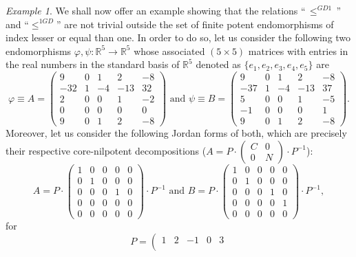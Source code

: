 \documentclass[10pt,a4paper]{amsart}
\theoremstyle{plain}
\theoremstyle{remark}
\newtheorem{exam}{Example}
\numberwithin{equation}{section} \numberwithin{defn}{section}
\newcommand{\f}{\varphi}
\newcommand{\g}{\psi}
\newcommand{\R}{\mathbb{R}}
\begin{document}
\begin{exam}\label{Ex: Non Trivial}
We shall now offer an example showing that the relations ``$\, \leq^{GD1} \,$'' and ``$\leq^{1GD}$'' are not trivial outside the set of finite potent endomorphisms of index lesser or equal than one. In order to do so, let us consider the following two endomorphisms $\f , \g \colon \R^5 \to \R^5$ whose associated $(5\times 5)$ matrices with entries in the real numbers in the standard basis of $\R^5$ denoted as $\{ e_1,e_2, e_3 , e_4, e_5 \}$ are $$\f\equiv A=\left(\begin{matrix}
9 & 0 & 1 & 2 & -8 \\
-32 & 1 & -4 & -13 & 32 \\
2 & 0 & 0 & 1 & -2 \\
0 & 0 & 0 & 0 & 0 \\
9 & 0 & 1 & 2 & -8
\end{matrix}\right) \text{ and } \g \equiv B=\left(\begin{matrix}
9 & 0 & 1 & 2 & -8 \\
-37 & 1 & -4 & -13 & 37 \\
5 & 0 & 0 & 1 & -5 \\
-1 & 0 & 0 & 0 & 1 \\
9 & 0 & 1 & 2 & -8
\end{matrix}\right).$$ Moreover, let us consider the following Jordan forms of both, which are precisely their respective core-nilpotent decompositions ($A=P\cdot \left(\begin{matrix}
C & 0 \\
0 & N
\end{matrix}\right) \cdot P^{-1}$): $$A=P\cdot \left(\begin{matrix}
1 & 0 & 0 & 0 & 0 \\
0 & 1 & 0 & 0 & 0 \\
0 & 0 & 0 & 1 & 0 \\
0 & 0 & 0 & 0 & 0 \\
0 & 0 & 0 & 0 & 0
\end{matrix}\right) \cdot P^{-1} \text{ and } B=P\cdot \left(\begin{matrix}
1 & 0 & 0 & 0 & 0 \\
0 & 1 & 0 & 0 & 0 \\
0 & 0 & 0 & 1 & 0 \\
0 & 0 & 0 & 0 & 1 \\
0 & 0 & 0 & 0 & 0
\end{matrix}\right) \cdot P^{-1}, $$ for $$P=\left(\begin{matrix}
1 & 2 & -1 & 0 & 3 \\

\end{matrix}$$
\end{exam}
\end{document}
